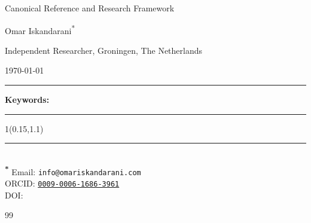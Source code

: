 \documentclass[aps,pre,preprint,notitlepage,nofootinbib,superscriptaddress]{revtex4-2}
\theoremstyle{definition}
\theoremstyle{plain}
\theoremstyle{remark}
\renewcommand{\cftsecfont}{\footnotesize}
\renewcommand{\cftsubsecfont}{\footnotesize\itshape}
\newcommand{\compacttoc}{%
    \begingroup
    \setlength{\cftparskip}{0pt}%
    \setlength{\cftbeforesecskip}{0.5pt}%
    \setlength{\cftbeforesubsecskip}{0.5pt}%
    \renewcommand{\cftsecfont}{\scriptsize}%
    \renewcommand{\cftsubsecfont}{\scriptsize\itshape}%
    \renewcommand{\cftsecpagefont}{\scriptsize}%
    \renewcommand{\cftsubsecpagefont}{\scriptsize}%
    \setlength{\cftsecnumwidth}{2.8em}%
    \setlength{\cftsubsecindent}{1.4em}%
    \renewcommand{\cftdotsep}{2}%
    \setlength{\parskip}{0pt}%
    \linespread{0.80}\selectfont
    \tableofcontents
    \endgroup
}
\begin{document}
    
    \thispagestyle{empty}

    \begin{center}
        \vspace*{0.015\textheight}

        {\LARGE\bfseries \papertitle\par}
        \vspace{0.25cm}

        {\large Canonical Reference and Research Framework\par}
        \vspace{0.4cm}

        {\Large Omar Iskandarani\textsuperscript{*}\par}
        \vspace{0.25cm}

        {\normalsize Independent Researcher, Groningen, The Netherlands\par}
        \vspace{0.3cm}

        {\normalsize \today\par}
        \vspace{0.3cm}

        \rule{0.82\textwidth}{0.5pt}
        \vspace{0.3cm}
    \end{center}


    \begin{abstract}
        \noindent

    \end{abstract}

    \vspace{0.2cm}
    \noindent\textbf{Keywords:} \paperkeywords

    \vspace{0.3cm}
    \noindent\rule{\textwidth}{0.4pt}
    \vspace{0.25cm}

    \medskip

    \begin{textblock*}{1\textwidth}(0.15\textwidth,1.1\textheight)\raggedright\footnotesize\renewcommand{\arraystretch}{1.0} \noindent\rule{\textwidth}{0.4pt}\\[0.5em]
        \textsuperscript{\textbf{*}} Email: \texttt{info@omariskandarani.com}\\
        ORCID: \texttt{\href{https://orcid.org/0009-0006-1686-3961}{0009-0006-1686-3961}}\\
        DOI: \href{https://doi.org/\paperdoi}{\paperdoi}
    \end{textblock*}
    
    \newpage
    \compacttoc
    \newpage


        \begin{thebibliography}{99}

        \end{thebibliography}
\end{document}
